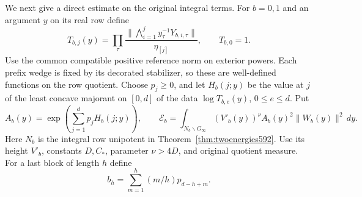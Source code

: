 \documentclass[a4paper,11pt]{article}
\theoremstyle{definition}
\theoremstyle{remark}
\numberwithin{equation}{section}
\begin{document}
We next give a direct estimate on the original integral terms.
For \(b=0,1\) and an argument \(y\) on its real row define
\[
 T_{b,j}(y)=\prod_\tau
 \frac{\|\bigwedge_{i=1}^j y_\tau^{-1}Y_{b,i,\tau}\|}
      {\eta_{[j]}},\qquad T_{b,0}=1 .
\]
Use the common compatible positive reference norm on exterior
powers. Each prefix wedge is fixed by its decorated stabilizer,
so these are well-defined functions on the row quotient. Choose
\(p_j\ge0\), and let \(H_b(j;y)\) be the value at \(j\) of the
least concave majorant on \([0,d]\) of the data
\(\log T_{b,e}(y)\), \(0\le e\le d\). Put
\[
  A_b(y)=\exp\left(\sum_{j=1}^d p_j H_b(j;y)\right),\qquad
  \mathcal E_b=\int_{N_b\backslash G_\infty}
          (V'_b(y))^\nu A_b(y)^2\|W_b(y)\|^2\,dy .
\]
Here \(N_b\) is the integral row unipotent in
Theorem~\ref{thm:twoenergies592}. Use its height \(V'_b\), constants
\(D,C_*\), parameter \(\nu>4D\), and original quotient measure.
For a last block of length \(h\) define
\[
                 b_h=\sum_{m=1}^h (m/h)p_{d-h+m}.
\]
\end{document}
